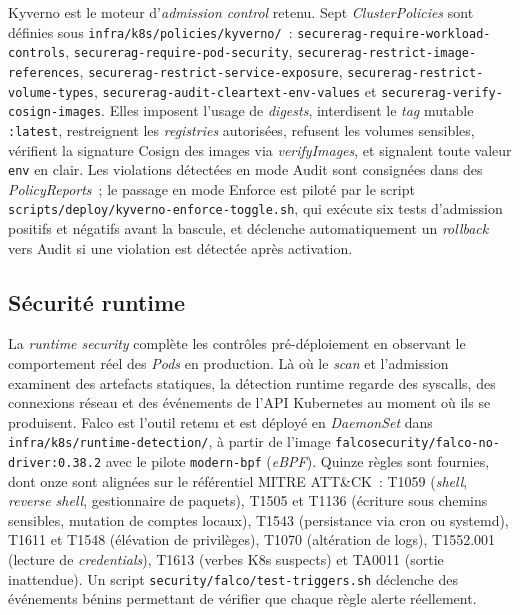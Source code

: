 Kyverno est le moteur d'\emph{admission control} retenu. Sept
\emph{ClusterPolicies} sont définies sous \texttt{infra/k8s/policies/kyverno/}~:
\texttt{securerag-require-workload-controls},
\texttt{securerag-require-pod-security},
\texttt{securerag-restrict-image-references},
\texttt{securerag-restrict-service-exposure},
\texttt{securerag-restrict-volume-types},
\texttt{securerag-audit-cleartext-env-values} et
\texttt{securerag-verify-cosign-images}. Elles imposent l'usage de
\emph{digests}, interdisent le \emph{tag} mutable \texttt{:latest},
restreignent les \emph{registries} autorisées, refusent les volumes
sensibles, vérifient la signature Cosign des images via \emph{verifyImages},
et signalent toute valeur \texttt{env} en clair.
Les violations détectées en mode Audit sont consignées dans des
\emph{PolicyReports}~; le passage en mode Enforce est piloté par le
script \texttt{scripts/deploy/kyverno-enforce-toggle.sh}, qui exécute six
tests d'admission positifs et négatifs avant la bascule, et déclenche
automatiquement un \emph{rollback} vers Audit si une violation est
détectée après activation.

\subsection{Sécurité runtime}
\label{subsec:concepts-runtime}

La \emph{runtime security} complète les contrôles pré-déploiement en
observant le comportement réel des \emph{Pods} en production. Là où le
\emph{scan} et l'admission examinent des artefacts statiques, la
détection runtime regarde des syscalls, des connexions réseau et des
événements de l'API Kubernetes au moment où ils se produisent. Falco
est l'outil retenu et est déployé en \emph{DaemonSet} dans
\texttt{infra/k8s/runtime-detection/}, à partir de l'image
\texttt{falcosecurity/falco-no-driver:0.38.2} avec le pilote
\texttt{modern-bpf} (\emph{eBPF}). Quinze règles sont fournies, dont
onze sont alignées sur le référentiel MITRE ATT\&CK~: T1059
(\emph{shell}, \emph{reverse shell}, gestionnaire de paquets), T1505 et
T1136 (écriture sous chemins sensibles, mutation de comptes locaux),
T1543 (persistance via cron ou systemd), T1611 et T1548 (élévation de
privilèges), T1070 (altération de logs), T1552.001 (lecture de
\emph{credentials}), T1613 (verbes K8s suspects) et TA0011 (sortie
inattendue). Un script \texttt{security/falco/test-triggers.sh} déclenche
des événements bénins permettant de vérifier que chaque règle alerte
réellement.

